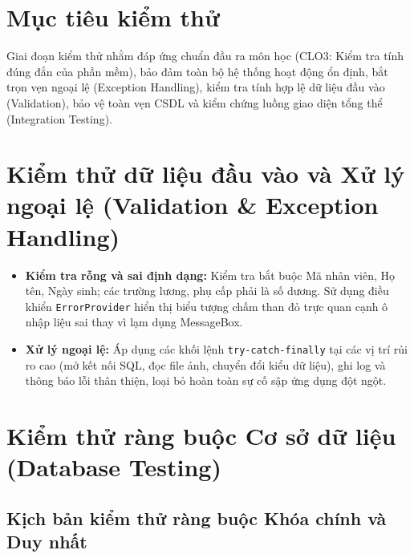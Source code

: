 \documentclass[12pt,a4paper]{report}
\begin{document}
\section{Mục tiêu kiểm thử}
Giai đoạn kiểm thử nhằm đáp ứng chuẩn đầu ra môn học (CLO3: Kiểm tra tính đúng đắn của phần mềm), bảo đảm toàn bộ hệ thống hoạt động ổn định, bắt trọn vẹn ngoại lệ (Exception Handling), kiểm tra tính hợp lệ dữ liệu đầu vào (Validation), bảo vệ toàn vẹn CSDL và kiểm chứng luồng giao diện tổng thể (Integration Testing).

\section{Kiểm thử dữ liệu đầu vào và Xử lý ngoại lệ (Validation \& Exception Handling)}
\begin{itemize}[leftmargin=1.0cm]
    \item \textbf{Kiểm tra rỗng và sai định dạng:} Kiểm tra bắt buộc Mã nhân viên, Họ tên, Ngày sinh; các trường lương, phụ cấp phải là số dương. Sử dụng điều khiển \texttt{ErrorProvider} hiển thị biểu tượng chấm than đỏ trực quan cạnh ô nhập liệu sai thay vì lạm dụng MessageBox.
    \item \textbf{Xử lý ngoại lệ:} Áp dụng các khối lệnh \texttt{try-catch-finally} tại các vị trí rủi ro cao (mở kết nối SQL, đọc file ảnh, chuyển đổi kiểu dữ liệu), ghi log và thông báo lỗi thân thiện, loại bỏ hoàn toàn sự cố sập ứng dụng đột ngột.
\end{itemize}

\section{Kiểm thử ràng buộc Cơ sở dữ liệu (Database Testing)}

\subsection{Kịch bản kiểm thử ràng buộc Khóa chính và Duy nhất}
\end{document}
